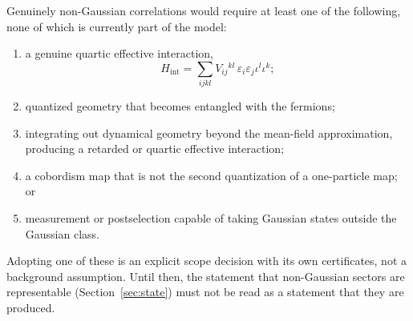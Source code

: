 \documentclass[11pt,letterpaper]{article}
\begin{document}
Genuinely non-Gaussian correlations would require at least one of the
following, none of which is currently part of the model:
\begin{enumerate}
  \item a genuine quartic effective interaction,
    \begin{equation*}
      H_{\mathrm{int}}
      =\sum_{ijkl}V_{ij}{}^{kl}\,
        \varepsilon_i\varepsilon_j\iota^l\iota^k;
    \end{equation*}
  \item quantized geometry that becomes entangled with the fermions;
  \item integrating out dynamical geometry beyond the mean-field
    approximation, producing a retarded or quartic effective interaction;
  \item a cobordism map that is not the second quantization of a one-particle
    map; or
  \item measurement or postselection capable of taking Gaussian states outside
    the Gaussian class.
\end{enumerate}
Adopting one of these is an explicit scope decision with its own certificates,
not a background assumption. Until then, the statement that non-Gaussian
sectors are representable (Section~\ref{sec:state}) must not be read as a
statement that they are produced.
\end{document}
